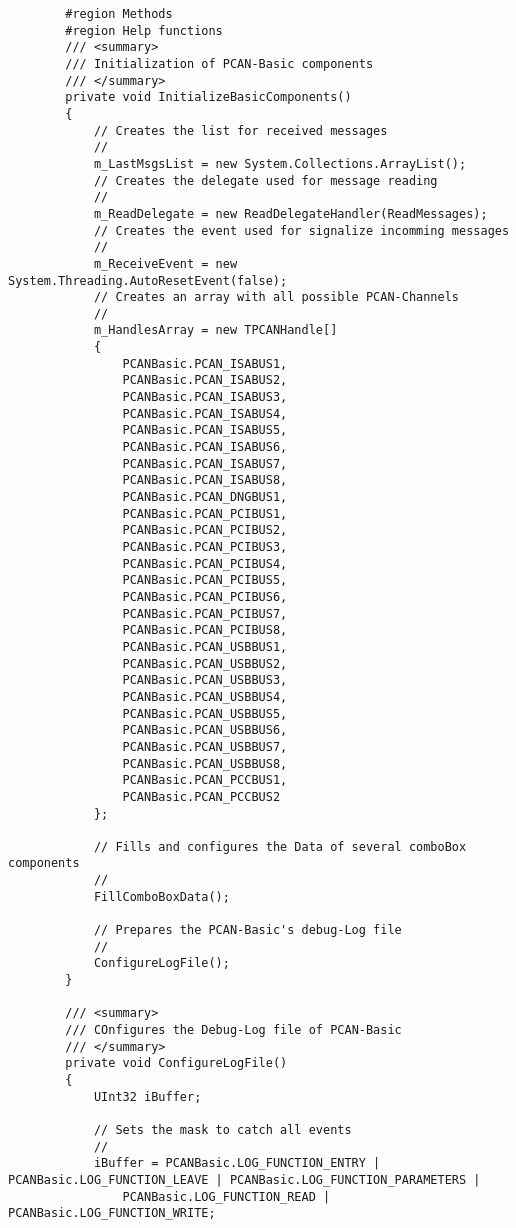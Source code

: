 \begin{lstlisting}
        #region Methods
        #region Help functions
        /// <summary>
        /// Initialization of PCAN-Basic components
        /// </summary>
        private void InitializeBasicComponents()
        {
            // Creates the list for received messages
            //
            m_LastMsgsList = new System.Collections.ArrayList();
            // Creates the delegate used for message reading
            //
            m_ReadDelegate = new ReadDelegateHandler(ReadMessages);
            // Creates the event used for signalize incomming messages
            //
            m_ReceiveEvent = new System.Threading.AutoResetEvent(false);
            // Creates an array with all possible PCAN-Channels
            //
            m_HandlesArray = new TPCANHandle[]
            {
                PCANBasic.PCAN_ISABUS1,
                PCANBasic.PCAN_ISABUS2,
                PCANBasic.PCAN_ISABUS3,
                PCANBasic.PCAN_ISABUS4,
                PCANBasic.PCAN_ISABUS5,
                PCANBasic.PCAN_ISABUS6,
                PCANBasic.PCAN_ISABUS7,
                PCANBasic.PCAN_ISABUS8,
                PCANBasic.PCAN_DNGBUS1,
                PCANBasic.PCAN_PCIBUS1,
                PCANBasic.PCAN_PCIBUS2,
                PCANBasic.PCAN_PCIBUS3,
                PCANBasic.PCAN_PCIBUS4,
                PCANBasic.PCAN_PCIBUS5,
                PCANBasic.PCAN_PCIBUS6,
                PCANBasic.PCAN_PCIBUS7,
                PCANBasic.PCAN_PCIBUS8,
                PCANBasic.PCAN_USBBUS1,
                PCANBasic.PCAN_USBBUS2,
                PCANBasic.PCAN_USBBUS3,
                PCANBasic.PCAN_USBBUS4,
                PCANBasic.PCAN_USBBUS5,
                PCANBasic.PCAN_USBBUS6,
                PCANBasic.PCAN_USBBUS7,
                PCANBasic.PCAN_USBBUS8,
                PCANBasic.PCAN_PCCBUS1,
                PCANBasic.PCAN_PCCBUS2
            };

            // Fills and configures the Data of several comboBox components
            //
            FillComboBoxData();

            // Prepares the PCAN-Basic's debug-Log file
            //
            ConfigureLogFile();
        }

        /// <summary>
        /// COnfigures the Debug-Log file of PCAN-Basic
        /// </summary>
        private void ConfigureLogFile()
        {
            UInt32 iBuffer;

            // Sets the mask to catch all events
            //
            iBuffer = PCANBasic.LOG_FUNCTION_ENTRY | PCANBasic.LOG_FUNCTION_LEAVE | PCANBasic.LOG_FUNCTION_PARAMETERS |
                PCANBasic.LOG_FUNCTION_READ | PCANBasic.LOG_FUNCTION_WRITE;


\end{lstlisting}
